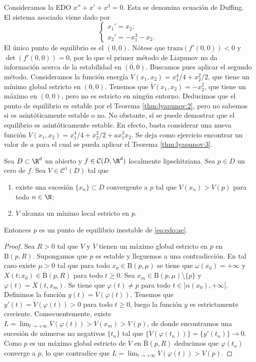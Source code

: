 \begin{ex}
  Consideramos la EDO $x'' + x' + x^3 = 0$. Esta se denomina ecuación de Duffing. El sistema
  asociado viene dado por
  \[
    \begin{cases}
      x_1' = x_2;\\
      x_2' = - x_1^3 - x_2.
    \end{cases}
  \]
  El único punto de equilibrio es el $(0,0)$. Nótese que $\mathrm{traza}(f'(0,0)) < 0$ y
  $\det(f'(0,0)) = 0$, por lo que el primer método de Liapunov no da información acerca de la
  estabilidad en $(0,0)$. Buscamos pues aplicar el segundo método. Consideramos la función energía
  $V(x_1, x_2) = x_1^4 / 4 + x_2^2 / 2$, que tiene un mínimo global estricto en $(0,0)$. Tenemos que
  $\dot{V}(x_1, x_2) = -x_2^2$, que tiene un máximo en $(0,0)$, pero no es estricto en ningún
  entorno. Deducimos que el punto de equilibrio es estable por el Teorema \ref{thm:lyapunov:2}, pero
  no sabemos si es asintóticamente estable o no. No obstante, sí se puede demostrar que el
  equilibrio es asintóticamente estable. En efecto, basta considerar una nueva función
  $V(x_1, x_2) = x_1^4 / 4 + x_2^2 / 2 + ax_1^3 x_2$. Se deja como ejercicio encontrar un valor de
  $a$ para el cual se pueda aplicar el Teorema \ref{thm:lyapunov:3}.
\end{ex}

\begin{theorem} 
  \label{thm:lyapunov:5}
  Sea $D \subset \R^d$ un abierto y $f \in \mathcal{C}(D, \R^d)$ localmente lipschitziana. Sea
  $p \in D$ un cero de $f$.  Sea $V \in \mathcal{C}^1(D)$ tal que
  \begin{enumerate}
  \item existe una sucesión $\{x_n\} \subset D$ convergente a $p$ tal que $V(x_n) > V(p)$ para todo
    $n \in \N$;
  \item $\dot{V}$ alcanza un mínimo local estricto en $p$.
  \end{enumerate}
  Entonces $p$ es un punto de equilibrio inestable de \eqref{eq:edo:ae}.
\end{theorem}
\begin{proof}
  Sea $R > 0$ tal que $V$ y $\dot{V}$ tienen un máximo global estricto en $p$ en
  $\mathrm{B}(p,R)$. Supongamos que $p$ es estable y lleguemos a una contradicción. En tal caso
  existe $\mu > 0$ tal que para todo $x_0 \in \mathrm{B}(p,\mu)$ se tiene que
  $\omega(x_0) = +\infty$ y $X(t;x_0) \in \overline{\mathrm{B}}(p,R)$ para todo $t \ge 0$. Sea
  $x_m \in \mathrm{B}(p,\mu) \setminus \{p\}$ y $\varphi(t) = X(t, x_m)$. Se tiene que
  $\varphi(t) \ne p$ para todo $t \in ]\alpha(x_0),+\infty[$.  Definimos la función
  $y(t) = V(\varphi(t))$. Tenemos que $y'(t) = \dot{V}(\varphi(t)) > 0$ para todo $t \ge 0$, luego
  la función $y$ es estrictamente creciente. Consecuentemente, existe
  $L = \lim_{t \to +\infty} V(\varphi(t)) > V(x_m) > V(p)$, de donde encontramos una sucesión de
  números no negativos $\{t_n\}$ tal que $\{\dot{V}(\varphi(t_n))\} = \{y'(t_n)\} \to 0$. Como $p$
  es un máximo global estricto de $\dot{V}$ en $\overline{\mathrm{B}}(p,R)$ deducimos que
  $\varphi(t_n)$ converge a $p$, lo que contradice que
  $L = \lim_{t \to +\infty} V(\varphi(t)) > V(p)$.
\end{proof}

